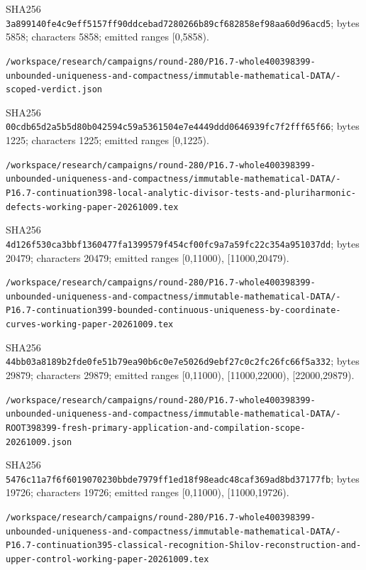 \documentclass[11pt]{article}
\begin{document}
SHA256 \texttt{3a899140fe4c9eff5157ff90ddcebad7280266b89cf682858ef98aa60d96acd5}; bytes 5858; characters 5858; emitted ranges [0,5858).

\texttt{/\allowbreak workspace/\allowbreak research/\allowbreak campaigns/\allowbreak round-280/\allowbreak P16.7-whole400398399-unbounded-uniqueness-and-compactness/\allowbreak immutable-mathematical-DATA/-scoped-verdict.json}

SHA256 \texttt{00cdb65d2a5b5d80b042594c59a5361504e7e4449ddd0646939fc7f2fff65f66}; bytes 1225; characters 1225; emitted ranges [0,1225).

\texttt{/\allowbreak workspace/\allowbreak research/\allowbreak campaigns/\allowbreak round-280/\allowbreak P16.7-whole400398399-unbounded-uniqueness-and-compactness/\allowbreak immutable-mathematical-DATA/-P16.7-continuation398-local-analytic-divisor-tests-and-pluriharmonic-defects-working-paper-20261009.tex}

SHA256 \texttt{4d126f530ca3bbf1360477fa1399579f454cf00fc9a7a59fc22c354a951037dd}; bytes 20479; characters 20479; emitted ranges [0,11000), [11000,20479).

\texttt{/\allowbreak workspace/\allowbreak research/\allowbreak campaigns/\allowbreak round-280/\allowbreak P16.7-whole400398399-unbounded-uniqueness-and-compactness/\allowbreak immutable-mathematical-DATA/-P16.7-continuation399-bounded-continuous-uniqueness-by-coordinate-curves-working-paper-20261009.tex}

SHA256 \texttt{44bb03a8189b2fde0fe51b79ea90b6c0e7e5026d9ebf27c0c2fc26fc66f5a332}; bytes 29879; characters 29879; emitted ranges [0,11000), [11000,22000), [22000,29879).

\texttt{/\allowbreak workspace/\allowbreak research/\allowbreak campaigns/\allowbreak round-280/\allowbreak P16.7-whole400398399-unbounded-uniqueness-and-compactness/\allowbreak immutable-mathematical-DATA/-ROOT398399-fresh-primary-application-and-compilation-scope-20261009.json}

SHA256 \texttt{5476c11a7f6f6019070230bbde7979ff1ed18f98eadc48caf369ad8bd37177fb}; bytes 19726; characters 19726; emitted ranges [0,11000), [11000,19726).

\texttt{/\allowbreak workspace/\allowbreak research/\allowbreak campaigns/\allowbreak round-280/\allowbreak P16.7-whole400398399-unbounded-uniqueness-and-compactness/\allowbreak immutable-mathematical-DATA/-P16.7-continuation395-classical-recognition-Shilov-reconstruction-and-upper-control-working-paper-20261009.tex}
\end{document}
